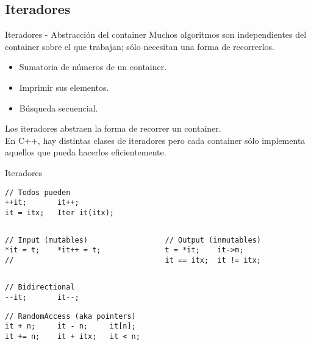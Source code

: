 \subsection{Iteradores}
\begin{frame}[fragile]{Iteradores - Abstracci\'on del container}
Muchos algoritmos son independientes del container sobre el que trabajan; s\'olo
necesitan una forma de recorrerlos.
   \pause
   \begin{itemize}
      \item Sumatoria de n\'umeros de un container.
      \item Imprimir sus elementos.
      \item B\'usqueda secuencial.
   \end{itemize}
   \pause
\vphantom{X}
Los iteradores abstraen la forma de recorrer un container.\\
En C++, hay distintas clases de iteradores pero cada container s\'olo implementa aquellos que pueda hacerlos \alert{eficientemente}.
\end{frame}
\begin{frame}[fragile]{Iteradores}
         \begin{lstlisting}[style=normal,xleftmargin=.3\textwidth,xrightmargin=.2\textwidth]
// Todos pueden
++it;       it++;
it = itx;   Iter it(itx);
         \end{lstlisting}
\pause
   \begin{columns}[t]
      \begin{column}{.4\linewidth}
         \begin{lstlisting}[style=normal,firstnumber=4]
// Input (mutables)
*it = t;    *it++ = t;
//
         \end{lstlisting}
      \end{column}
      \begin{column}{.4\linewidth}
\pause
         \begin{lstlisting}[style=normal,firstnumber=4]
// Output (inmutables)
t = *it;    it->m;
it == itx;  it != itx;
         \end{lstlisting}
      \end{column}
   \end{columns}
\pause
         \begin{lstlisting}[style=normal,xleftmargin=.3\textwidth,xrightmargin=.2\textwidth,firstnumber=last]
// Bidirectional
--it;       it--;
         \end{lstlisting}
\pause
         \begin{lstlisting}[style=normal,xleftmargin=.2\textwidth,xrightmargin=.2\textwidth,firstnumber=last]
// RandomAccess (aka pointers)
it + n;     it - n;     it[n];
it += n;    it + itx;   it < n;
         \end{lstlisting}
\end{frame}
